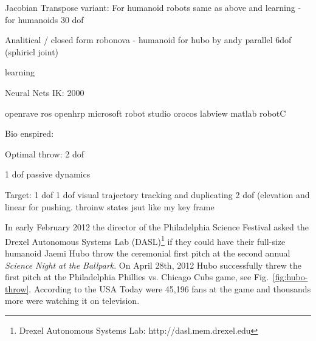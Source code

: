 
Jacobian Transpose variant:
\cite{ik99999}
\cite{ik844073} For humanoid robots
\cite{ik973374} same as above and learning - for humanoids 30 dof
\cite{ik4655620}

Analitical / closed form
\cite{ik5163900} robonova - humanoid 
\cite{5649842} for hubo by andy
\cite{ik97878} parallel
\cite{ik326569} 6dof (sphiricl joint)
\cite{ik1087114} 


learning
\cite{ik-4543497}

Neural Nets IK:
\cite{ik845162} 2000
\cite{ik23979}
\cite{ik131985}
\cite{ik832704}
\cite{ik1662342}
\cite{ik932681}

\cite{diankovThesis} openrave
\cite{ros} ros
\cite{openhrp} openhrp
\cite{microsoftRobot4437755} microsoft robot studio
\cite{orocos} orocos
\cite{labview} labview
\cite{matlab} matlab
\cite{robotc} robotC




Bio enspired:
\cite{throw6071965}

Optimal throw:
\cite{throw6347845} 2 dof

\cite{throw5347013} 1 dof
\cite{throw6386000} passive dynamics


Target:
\cite{throw5152438} 1 dof
\cite{throw5423199} 1 dof visual trajectory tracking and duplicating
\cite{throw6224565} 2 dof (elevation and linear for pushing. throinw states jsut like my key frame








In early February 2012 the director of the Philadelphia Science Festival asked the Drexel Autonomous Systems Lab (DASL)\footnote{Drexel Autonomous Systems Lab: http://dasl.mem.drexel.edu}\label{foot:dasl} if they could have their full-size humanoid Jaemi Hubo throw the ceremonial first pitch at the second annual \textit{Science Night at the Ballpark}.  
On April 28th, 2012 Hubo successfully threw the first pitch at the Philadelphia Phillies vs. Chicago Cubs game, see Fig.~\ref{fig:hubo-throw}.  According to the USA Today were 45,196 fans at the game and thousands
more were watching it on television.

